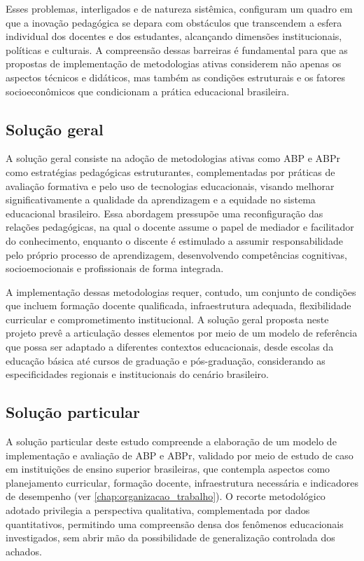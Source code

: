 Esses problemas, interligados e de natureza sistêmica, configuram um quadro em que a inovação pedagógica se depara com obstáculos que transcendem a esfera individual dos docentes e dos estudantes, alcançando dimensões institucionais, políticas e culturais. A compreensão dessas barreiras é fundamental para que as propostas de implementação de metodologias ativas considerem não apenas os aspectos técnicos e didáticos, mas também as condições estruturais e os fatores socioeconômicos que condicionam a prática educacional brasileira.

\subsection{Solução geral}
\label{subsec:solucao_geral}

A solução geral consiste na adoção de metodologias ativas como ABP e ABPr como estratégias pedagógicas estruturantes, complementadas por práticas de avaliação formativa e pelo uso de tecnologias educacionais, visando melhorar significativamente a qualidade da aprendizagem e a equidade no sistema educacional brasileiro. Essa abordagem pressupõe uma reconfiguração das relações pedagógicas, na qual o docente assume o papel de mediador e facilitador do conhecimento, enquanto o discente é estimulado a assumir responsabilidade pelo próprio processo de aprendizagem, desenvolvendo competências cognitivas, socioemocionais e profissionais de forma integrada.

A implementação dessas metodologias requer, contudo, um conjunto de condições que incluem formação docente qualificada, infraestrutura adequada, flexibilidade curricular e comprometimento institucional. A solução geral proposta neste projeto prevê a articulação desses elementos por meio de um modelo de referência que possa ser adaptado a diferentes contextos educacionais, desde escolas da educação básica até cursos de graduação e pós-graduação, considerando as especificidades regionais e institucionais do cenário brasileiro.

\subsection{Solução particular}
\label{subsec:solucao_particular}

A solução particular deste estudo compreende a elaboração de um modelo de implementação e avaliação de ABP e ABPr, validado por meio de estudo de caso em instituições de ensino superior brasileiras, que contempla aspectos como planejamento curricular, formação docente, infraestrutura necessária e indicadores de desempenho (ver \ref{chap:organizacao_trabalho}). O recorte metodológico adotado privilegia a perspectiva qualitativa, complementada por dados quantitativos, permitindo uma compreensão densa dos fenômenos educacionais investigados, sem abrir mão da possibilidade de generalização controlada dos achados.

